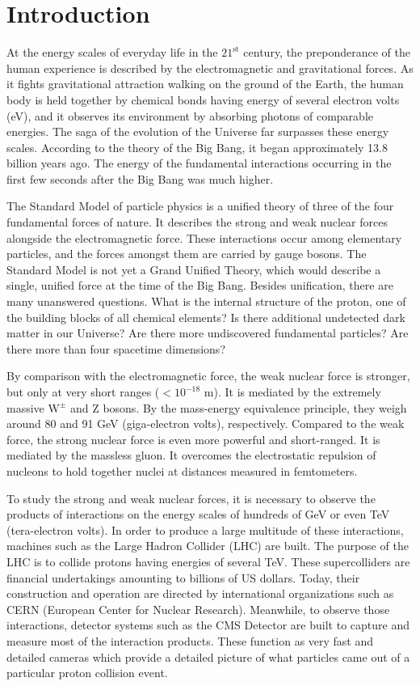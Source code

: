 \chapter{Introduction}
At the energy scales of everyday life in the $21^{\mathrm{st}}$ century, the preponderance of the human experience is described by the electromagnetic and gravitational forces.
As it fights gravitational attraction walking on the ground of the Earth,
the human body is held together by chemical bonds having energy of several electron volts (eV),
and it observes its environment by absorbing photons of comparable energies.
The saga of the evolution of the Universe far surpasses these energy scales.
According to the theory of the Big Bang, it began approximately 13.8 billion years ago.
The energy of the fundamental interactions occurring in the first few seconds after the Big Bang was much higher.

The Standard Model of particle physics is a unified theory of three of the four fundamental forces of nature.
It describes the strong and weak nuclear forces alongside the electromagnetic force.
These interactions occur among elementary particles, and the forces amongst them are carried by gauge bosons.
The Standard Model is not yet a Grand Unified Theory, which would describe a single, unified force at the time of the Big Bang.
Besides unification, there are many unanswered questions.
What is the internal structure of the proton, one of the building blocks of all chemical elements?
Is there additional undetected dark matter in our Universe?
Are there more undiscovered fundamental particles?
Are there more than four spacetime dimensions?

By comparison with the electromagnetic force, the weak nuclear force is stronger, but only at very short ranges ($< 10^{{-}18}$ m).
It is mediated by the extremely massive $\mathrm{W^\pm}$ and Z bosons.
By the mass-energy equivalence principle, they weigh around 80 and 91 GeV (giga-electron volts), respectively.
Compared to the weak force, the strong nuclear force is even more powerful and short-ranged.
It is mediated by the massless gluon.
It overcomes the electrostatic repulsion of nucleons to hold together nuclei at distances measured in femtometers.

To study the strong and weak nuclear forces, it is necessary to observe
the products of interactions on the energy scales of hundreds of GeV or even TeV (tera-electron volts).
In order to produce a large multitude of these interactions,
machines such as the Large Hadron Collider (LHC) are built.
The purpose of the LHC is to collide protons having energies of several TeV.
These supercolliders are financial undertakings amounting to billions of US dollars.
Today, their construction and operation are directed by international organizations such as CERN (European Center for Nuclear Research).
Meanwhile, to observe those interactions, detector systems such as the CMS Detector are built to capture and measure most of the interaction products.
These function as very fast and detailed cameras which provide a detailed picture of what particles came out of a particular proton collision event.

